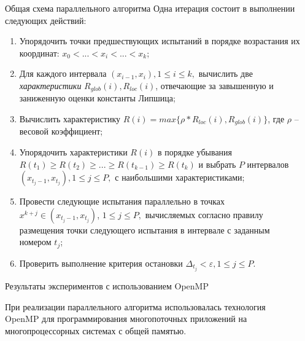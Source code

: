\documentclass{beamer}
\begin{document}
\begin{frame}[t]
\begin{columns}[t]
\begin{column}[t]{0.465\paperwidth}
        \end{column}
        \begin{column}[t]{0.47\paperwidth}
          \begin{block}{Общая схема параллельного алгоритма}
\leftskip=0.5cm \rightskip=0.5cm 
\setlength{\parindent}{1.25cm} %
Одна итерация состоит в выполнении следующих действий:
              \begin{enumerate}
              \leftskip=0.5cm \rightskip=0.5cm 
\setlength{\parindent}{1.25cm} %
                \justifying
                \item Упорядочить точки предшествующих испытаний в порядке возрастания их координат: \(x_{0}<...<x_{i}<...<x_{k}\);
                \item Для каждого интервала \((x_{i-1}, x_{i}),1\leqslant i\leqslant k,\) вычислить две \textit{характеристики} \(R_{glob}(i), R_{loc}(i)\), отвечающие за завышенную и заниженную оценки константы Липшица;
                \item Вычислить характеристику \(R(i) = max⁡\{\rho*R_{loc}(i),R_{glob}(i)\}\), где \(\rho\) -- весовой коэффициент; 
                \item Упорядочить характеристики \(R(i)\) в порядке убывания \(R(t_{1})\geqslant R(t_{2})\geqslant ... \geqslant  R(t_{k-1})\geqslant R(t_{k})\) и выбрать \(P\) интервалов \((x_{t_j-1}, x_{t_j}), 1\leqslant j \leqslant P,\) с наибольшими характеристиками;
                \item Провести следующие испытания параллельно в точках  \(x^{k+j} \in (x_{t_j-1}, x_{t_j})\), \(1\leqslant j \leqslant P,\) вычисляемых согласно правилу размещения точки следующего испытания в интервале с заданным номером \(t_j\);
                \item Проверить выполнение критерия остановки \(\Delta_{t_j}<\varepsilon, 1\leqslant j \leqslant P\).
              \end{enumerate}

\end{block}


\begin{block}{Результаты экспериментов с использованием OpenMP}

\leftskip=0.5cm \rightskip=0.5cm 
\setlength{\parindent}{1.25cm} %
При реализации параллельного алгоритма использовалась технология OpenMP для программирования многопоточных приложений на многопроцессорных системах с общей памятью.


\end{block}
\end{column}
\end{columns}
\end{frame}
\end{document}
